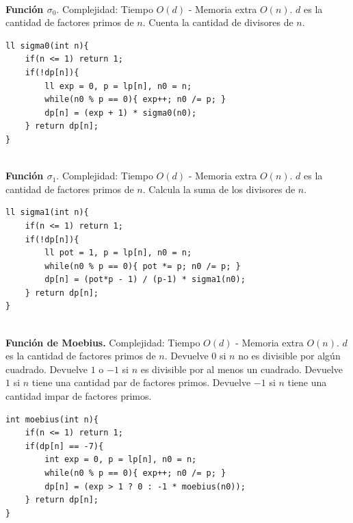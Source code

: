 \documentclass[10pt,spanish,mexico]{article}
\numberwithin{equation}{section}
\begin{document}
\begin{multicols}{2}
\vspace{-1.2\baselineskip}
\hrulefill\\
\textbf{Función $\sigma_0$}. Complejidad: Tiempo $O(d)$ - Memoria extra $O(n)$. $d$ es la cantidad de factores primos de $n$. Cuenta la cantidad de divisores de $n$.
\begin{verbatim}
ll sigma0(int n){
    if(n <= 1) return 1;
    if(!dp[n]){
        ll exp = 0, p = lp[n], n0 = n;
        while(n0 % p == 0){ exp++; n0 /= p; }
        dp[n] = (exp + 1) * sigma0(n0);
    } return dp[n];
}
\end{verbatim}

\vspace{-1.2\baselineskip}
\hrulefill\\
\textbf{Función $\sigma_1$}. Complejidad: Tiempo $O(d)$ - Memoria extra $O(n)$. $d$ es la cantidad de factores primos de $n$. Calcula la suma de los divisores de $n$.
\begin{verbatim}
ll sigma1(int n){
    if(n <= 1) return 1;
    if(!dp[n]){
        ll pot = 1, p = lp[n], n0 = n;
        while(n0 % p == 0){ pot *= p; n0 /= p; }
        dp[n] = (pot*p - 1) / (p-1) * sigma1(n0);
    } return dp[n];
}
\end{verbatim}

\vspace{-1.2\baselineskip}
\hrulefill\\
\textbf{Función de Moebius.} Complejidad: Tiempo $O(d)$ - Memoria extra $O(n)$. $d$ es la cantidad de factores primos de $n$. Devuelve $0$ si $n$ no es divisible por algún cuadrado. Devuelve $1$ o $-1$ si $n$ es divisible por al menos un cuadrado. Devuelve $1$ si $n$ tiene una cantidad par de factores primos. Devuelve $-1$ si $n$ tiene una cantidad impar de factores primos.
\begin{verbatim}
int moebius(int n){
    if(n <= 1) return 1;
    if(dp[n] == -7){
        int exp = 0, p = lp[n], n0 = n;
        while(n0 % p == 0){ exp++; n0 /= p; }
        dp[n] = (exp > 1 ? 0 : -1 * moebius(n0));
    } return dp[n];
}
\end{verbatim}

\vspace{-1.2\baselineskip}
\hrulefill

\end{multicols}
\end{document}
